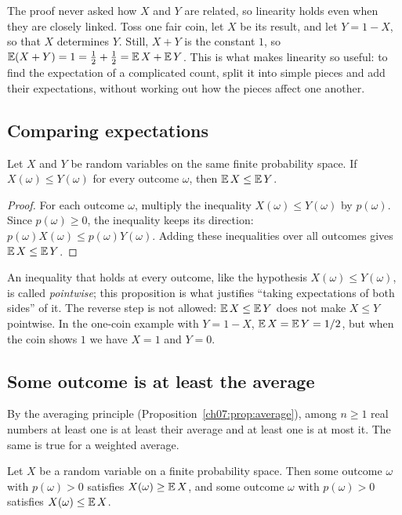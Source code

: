 The proof never asked how $X$ and $Y$ are related, so linearity holds even when they are closely linked. Toss one fair coin, let $X$ be its result, and let $Y=1-X$, so that $X$ determines $Y$. Still, $X+Y$ is the constant $1$, so $\operatorname{\mathbb E}(X+Y)=1=\tfrac12+\tfrac12=\operatorname{\mathbb E} X+\operatorname{\mathbb E} Y$. This is what makes linearity so useful: to find the expectation of a complicated count, split it into simple pieces and add their expectations, without working out how the pieces affect one another.

\subsection*{Comparing expectations}
\par\noindent\begin{minipage}{\linewidth}
\begin{proposition}\label{ch13:prop:monotone}
Let $X$ and $Y$ be random variables on the same finite probability space. If $X(\omega)\le Y(\omega)$ for every outcome $\omega$, then $\operatorname{\mathbb E} X\le\operatorname{\mathbb E} Y$.
\end{proposition}
\end{minipage}\par

\begin{proof}
For each outcome $\omega$, multiply the inequality $X(\omega)\le Y(\omega)$ by $p(\omega)$. Since $p(\omega)\ge0$, the inequality keeps its direction: $p(\omega)X(\omega)\le p(\omega)Y(\omega)$. Adding these inequalities over all outcomes gives $\operatorname{\mathbb E} X\le\operatorname{\mathbb E} Y$.
\end{proof}

An inequality that holds at every outcome, like the hypothesis $X(\omega)\le Y(\omega)$, is called \emph{pointwise}; this proposition is what justifies ``taking expectations of both sides'' of it. The reverse step is not allowed: $\operatorname{\mathbb E} X\le\operatorname{\mathbb E} Y$ does not make $X\le Y$ pointwise. In the one-coin example with $Y=1-X$, $\operatorname{\mathbb E} X=\operatorname{\mathbb E} Y=1/2$, but when the coin shows $1$ we have $X=1$ and $Y=0$.

\subsection*{Some outcome is at least the average}
By the averaging principle (Proposition~\ref{ch07:prop:average}), among $n\ge1$ real numbers at least one is at least their average and at least one is at most it. The same is true for a weighted average.

\par\noindent\begin{minipage}{\linewidth}
\begin{proposition}\label{ch13:prop:above-average}
Let $X$ be a random variable on a finite probability space. Then some outcome $\omega$ with $p(\omega)>0$ satisfies $X(\omega)\ge\operatorname{\mathbb E} X$, and some outcome $\omega$ with $p(\omega)>0$ satisfies $X(\omega)\le\operatorname{\mathbb E} X$.
\end{proposition}
\end{minipage}\par

